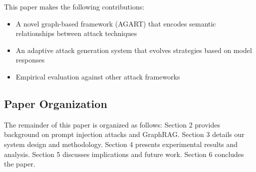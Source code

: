 This paper makes the following contributions:
\begin{itemize}
\item A novel graph-based framework (AGART) that encodes semantic relationships between attack techniques
\item An adaptive attack generation system that evolves strategies based on model responses
\item Empirical evaluation against other attack frameworks
\end{itemize}

\subsection{Paper Organization}
The remainder of this paper is organized as follows: Section 2 provides background on prompt injection attacks and GraphRAG. Section 3 details our system design and methodology. Section 4 presents experimental results and analysis. Section 5 discusses implications and future work. Section 6 concludes the paper. 